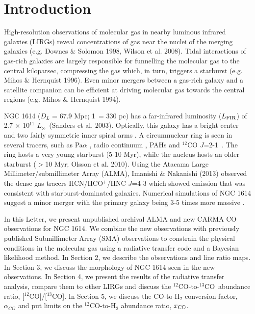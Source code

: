 \documentclass[preprint, 11pt]{aastex}
\newcommand{\tco}{$^{13}$CO}
\newcommand{\co}{$^{12}$CO}
\newcommand{\cotwo}{$^{12}$CO $J$=2-1}
\newcommand{\lfir}{$L_{\rm{FIR}}$}
\newcommand{\lsol}{$L_{\odot}$}
\newcommand{\xco}{[$^{12}$CO]/[$^{13}$CO]}
\newcommand{\xh}{$x_{\rm{CO}}$}
\begin{document}
\section{Introduction} %


High-resolution observations of molecular gas in nearby luminous infrared galaxies (LIRGs) reveal concentrations of gas near the nuclei of the merging galaxies (e.g. Downes $\&$ Solomon 1998\nocite{Downes1998}, Wilson et al. 2008\nocite{Wilson2008}).  Tidal interactions of gas-rich galaxies are largely responsible for funnelling the molecular gas to the central kiloparsec, compressing the gas which, in turn, triggers a starburst (e.g. Mihos $\&$ Hernquist 1996\nocite{Mihos1996}). Even minor mergers between a gas-rich galaxy and a satellite companion can be efficient at driving molecular gas towards the central regions (e.g. Mihos $\&$ Hernquist 1994\nocite{Mihos1994}). 



NGC 1614 ($D_{L}$ = 67.9 Mpc; 1\arcsec\ = 330 pc) has a far-infrared luminosity (\lfir) of 2.7 $\times$ 10$^{11}$ \lsol\ (Sanders et al. 2003)\nocite{Sanders2003}. Optically, this galaxy has a bright center and two fairly symmetric inner spiral arms \citep{Neff1990}. A circumnuclear ring is seen in several tracers, such as Pa$\alpha$ \citep{AlonsoHerrero2001}, radio continuum \citep{Olsson2010}, PAHs \citep{Vaisanen2012} and \cotwo\ \citep{Konig2013}. The ring hosts a very young starburst (5-10 Myr), while the nucleus hosts an older starburst ($>$10 Myr; Olsson et al. 2010).  Using the Atacama Large Millimeter/submillimeter Array (ALMA), Imanishi $\&$ Nakanishi (2013)\nocite{Imanishi2013} observed the dense gas tracers HCN/HCO$^{+}$/HNC $J$=4-3  which showed emission that was consistent with starburst-dominated galaxies. Numerical simulations of NGC 1614 suggest a minor merger with the primary galaxy being 3-5 times more massive \citep{Vaisanen2012}.

In this Letter, we present unpublished archival ALMA and new CARMA CO observations for NGC 1614. We combine the new observations with previously published Submillimeter Array (SMA) observations to constrain the physical conditions in the molecular gas using a radiative transfer code and a Bayesian likelihood method. In Section 2, we describe the observations and line ratio maps. In Section 3, we discuss the morphology of NGC 1614 seen in the new observations. In Section 4, we present the results of the radiative transfer analysis, compare them to other LIRGs and discuss the \co-to-\tco\ abundance ratio, \xco. In Section 5, we discuss the CO-to-H$_{2}$ conversion factor, $\alpha_{CO}$ and put limits on the \co-to-H$_{2}$ abundance ratio, \xh. 
\end{document}
